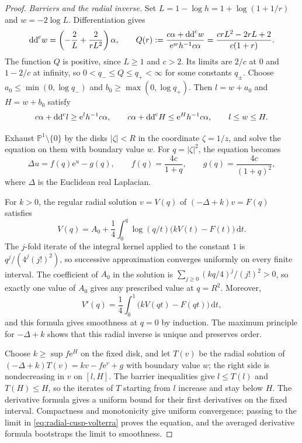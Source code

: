 \begin{proof}
\emph{Barriers and the radial inverse.}
Set $L=1-\log h=1+\log(1+1/r)$ and $w=-2\log L$. Differentiation gives
\[
 \mathrm{dd}^{\mathrm{c}} w=\left(-\frac2L+\frac2{rL^2}\right)\alpha,\qquad
 Q(r):=\frac{c\alpha+\mathrm{dd}^{\mathrm{c}} w}{\mathrm{e}^{w}h^{-1}c\alpha}
 =\frac{crL^2-2rL+2}{c(1+r)}.
\]
The function $Q$ is positive, since $L\geq1$ and $c>2$. Its limits are $2/c$ at $0$ and $1-2/c$ at infinity, so $0<q_-\leq Q\leq q_+<\infty$ for some constants $q_\pm$. Choose $a_0\leq\min(0,\log q_-)$ and $b_0\geq\max(0,\log q_+)$. Then $l=w+a_0$ and $H=w+b_0$ satisfy
\[
 c\alpha+\mathrm{dd}^{\mathrm{c}} l\geq\mathrm{e}^{l}h^{-1}c\alpha,\qquad
 c\alpha+\mathrm{dd}^{\mathrm{c}} H\leq\mathrm{e}^{H}h^{-1}c\alpha,\qquad l\leq w\leq H.
\]

Exhaust $\mathbb P^1\setminus\{0\}$ by the disks $|\zeta|<R$ in the coordinate $\zeta=1/z$, and solve the equation on them with boundary value $w$. For $q=|\zeta|^2$, the equation becomes
\[
 \Delta u=f(q)\mathrm{e}^{u}-g(q),\qquad
 f(q)=\frac{4c}{1+q},\qquad g(q)=\frac{4c}{(1+q)^2},
\]
where $\Delta$ is the Euclidean real Laplacian.

For $k>0$, the regular radial solution $v=V(q)$ of $(-\Delta+k)v=F(q)$ satisfies
\begin{equation}\label{eq:radial-cusp-volterra}
 V(q)=A_0+\frac14\int_0^q\log(q/t)\bigl(kV(t)-F(t)\bigr)\,\mathrm{d}t.
\end{equation}
The $j$-fold iterate of the integral kernel applied to the constant $1$ is $q^j/(4^j(j!)^2)$, so successive approximation converges uniformly on every finite interval. The coefficient of $A_0$ in the solution is $\sum_{j\geq0}(kq/4)^j/(j!)^2>0$, so exactly one value of $A_0$ gives any prescribed value at $q=R^2$. Moreover,
\[
 V'(q)=\frac14\int_0^1\bigl(kV(qt)-F(qt)\bigr)\,\mathrm{d}t,
\]
and this formula gives smoothness at $q=0$ by induction. The maximum principle for $-\Delta+k$ shows that this radial inverse is unique and preserves order.

Choose $k\geq\sup f\mathrm{e}^{H}$ on the fixed disk, and let $T(v)$ be the radial solution of $(-\Delta+k)T(v)=kv-f\mathrm{e}^{v}+g$ with boundary value $w$; the right side is nondecreasing in $v$ on $[l,H]$. The barrier inequalities give $l\leq T(l)$ and $T(H)\leq H$, so the iterates of $T$ starting from $l$ increase and stay below $H$. The derivative formula gives a uniform bound for their first derivatives on the fixed interval. Compactness and monotonicity give uniform convergence; passing to the limit in \eqref{eq:radial-cusp-volterra} proves the equation, and the averaged derivative formula bootstraps the limit to smoothness.


\end{proof}
